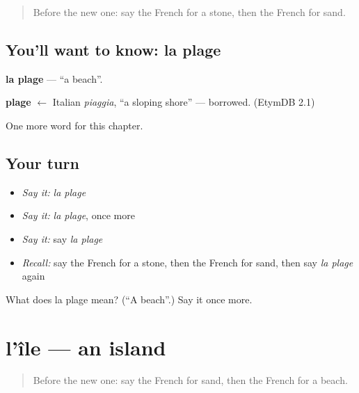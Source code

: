 \label{lesson:FR-C82-plage}



\begin{quote}
Before the new one: say the French for a stone, then the French for sand.
\end{quote}

\subsection*{You'll want to know: la plage}
\textbf{la plage} — \textquotedblleft{}a beach\textquotedblright{}.

\begin{cousinweb}
\textbf{plage} $\leftarrow$ Italian \emph{piaggia}, \textquotedblleft{}a sloping shore\textquotedblright{} — borrowed. (EtymDB 2.1)
\end{cousinweb}

\begin{grammarlens}[title={What you've built}]
One more word for this chapter.
\end{grammarlens}

\subsection*{Your turn}
\begin{itemize}
\raggedright
  \item \emph{Say it:} \emph{la plage}
  \item \emph{Say it:} \emph{la plage}, once more
  \item \emph{Say it:} say \emph{la plage}
  \item \emph{Recall:} say the French for a stone, then the French for sand, then say \emph{la plage} again
\end{itemize}

\begin{tcolorbox}[breakable,colback=teal!4,colframe=teal!35!black,title={Before you move on}]
What does la plage mean? (\textquotedblleft{}A beach\textquotedblright{}.) Say it once more.
\end{tcolorbox}
\section[l'île]{l'île — an island}

\label{lesson:FR-C82-ile}



\begin{quote}
Before the new one: say the French for sand, then the French for a beach.
\end{quote}

